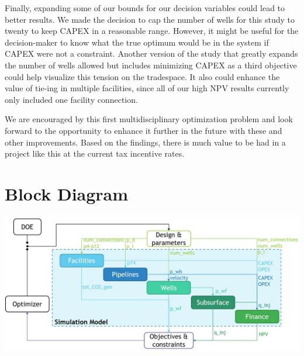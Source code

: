 \documentclass[balance,upint,subscriptcorrection,varvw,mathalfa=cal=boondoxo,spanish,french,vietnamese,russian,greek,pdf-a,colorlinks]{asmeconf}
\begin{document}
Finally, expanding some of our bounds for our decision variables could lead to better results. We made the decision to cap the number of wells for this study to twenty to keep CAPEX in a reasonable range. However, it might be useful for the decision-maker to know what the true optimum would be in the system if CAPEX were not a constraint. Another version of the study that greatly expands the number of wells allowed but includes minimizing CAPEX as a third objective could help visualize this tension on the tradespace. It also could enhance the value of tie-ing in multiple facilities, since all of our high NPV results currently only included one facility connection.

We are encouraged by this first multidisciplinary optimization problem and look forward to the opportunity to enhance it further in the future with these and other improvements. Based on the findings, there is much value to be had in a project like this at the current tax incentive rates.



\clearpage
\appendix

\section[Appendix A]{Block Diagram}\label{appendix:a}

\begin{center}
    \includegraphics[width=2\linewidth]{images/Block_diagram.jpg}
\end{center}
 \clearpage
\end{document}

